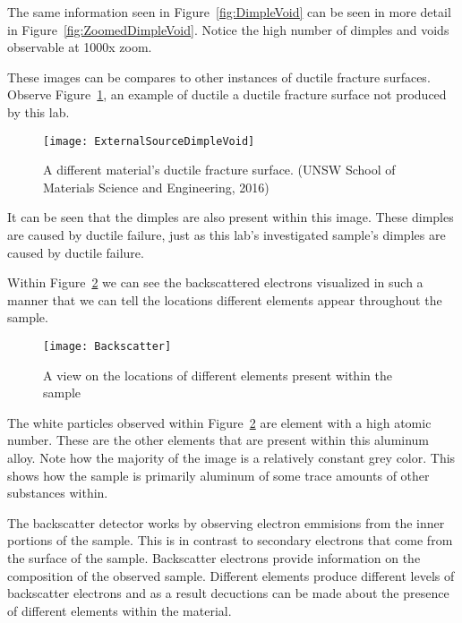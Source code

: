 \documentclass{article}
\begin{document}
The same information seen in Figure~\ref{fig:DimpleVoid} can be seen in more detail in Figure~\ref{fig:ZoomedDimpleVoid}. Notice the high number of dimples and voids observable at 1000x zoom.

These images can be compares to other instances of ductile fracture surfaces. Observe Figure~\ref{fig:ExternalSourceDimpleVoid}, an example  of ductile a ductile fracture surface not produced by this lab.

\begin{figure}[H]
\begin{center}
\texttt{[image: ExternalSourceDimpleVoid]}
\caption{A different material's ductile fracture surface. (UNSW School of Materials Science and Engineering, 2016)}
\label{fig:ExternalSourceDimpleVoid}
\end{center}
\end{figure}

It can be seen that the dimples are also present within this image. These dimples are caused by ductile failure, just as this lab's investigated sample's dimples are caused by ductile failure.

Within Figure~\ref{fig:Backscatter} we can see the backscattered electrons visualized in such a manner that we can tell the locations different elements appear throughout the sample.

\begin{figure}[H]
\begin{center}
\texttt{[image: Backscatter]}
\caption{A view on the locations of different elements present within the sample}
\label{fig:Backscatter}
\end{center}
\end{figure}

The white particles observed within Figure~\ref{fig:Backscatter} are element with a high atomic number. These are the other elements that are present within this aluminum alloy. Note how the majority of the image is a relatively constant grey color. This shows how the sample is primarily aluminum of some trace amounts of other substances within.

The backscatter detector works by observing electron emmisions from the inner portions of the sample. This is in contrast to secondary electrons that come from the surface of the sample. Backscatter electrons provide information on the composition of the observed sample. Different elements produce different levels of backscatter electrons and as a result decuctions can be made about the presence of different elements within the material.
\end{document}
